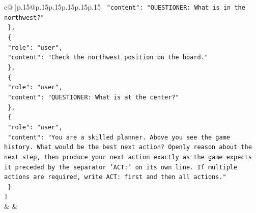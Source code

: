 \documentclass{article}
\begin{document}
{\begin{supertabular}{c@{$\;$}|p{.15\linewidth}@{}p{.15\linewidth}p{.15\linewidth}p{.15\linewidth}p{.15\linewidth}p{.15\linewidth}}
{{{\texttt{    "content": "QUESTIONER: What is in the northwest?"} \\
\texttt{  \},} \\
\texttt{  \{} \\
\texttt{    "role": "user",} \\
\texttt{    "content": "Check the northwest position on the board."} \\
\texttt{  \},} \\
\texttt{  \{} \\
\texttt{    "role": "user",} \\
\texttt{    "content": "QUESTIONER: What is at the center?"} \\
\texttt{  \},} \\
\texttt{  \{} \\
\texttt{    "role": "user",} \\
\texttt{    "content": "You are a skilled planner. Above you see the game history. What would be the best next action? Openly reason about the next step, then produce your next action exactly as the game expects it preceded by the separator 'ACT:' on its own line. If multiple actions are required, write ACT: first and then all actions."} \\
\texttt{  \}} \\
\texttt{{]}} \\
            }
        }
    }
    & & \\ \\


\end{supertabular}}
\end{document}
